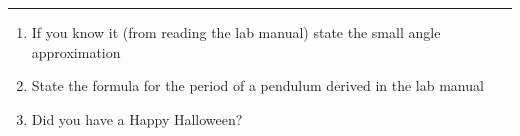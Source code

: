 \documentclass[11pt]{article}
\begin{document}
\Large

\medskip\hrule\bigskip\bigskip
{}
\begin{enumerate}

\item If you know it (from reading the lab manual) state the small angle approximation 
  \vspace*{0.27\textheight}
\item State the formula for the period of a pendulum derived in the lab manual
  \vspace*{0.27\textheight}
\item Did you have a Happy Halloween?
  
\end{enumerate}
\end{document}
